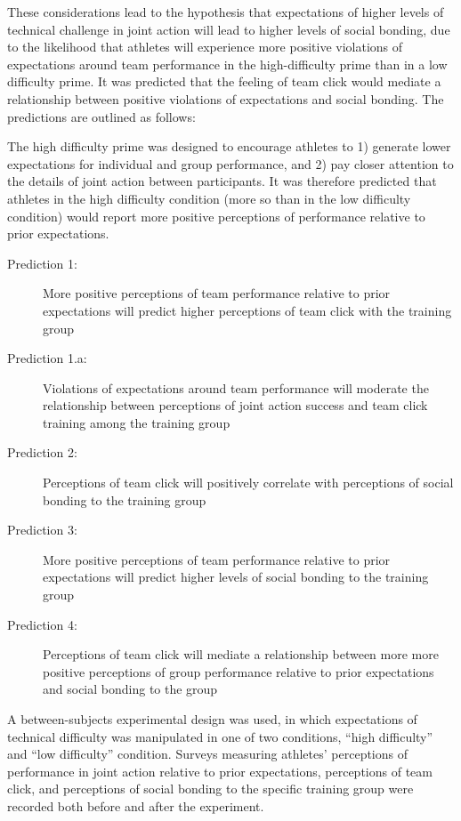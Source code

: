 These considerations lead to the hypothesis that expectations of higher levels of technical challenge in joint action will lead to higher levels of social bonding, due to the likelihood that athletes will experience more positive violations of expectations around team performance in the high-difficulty prime than in a low difficulty prime. It was predicted that the feeling of team click would mediate a relationship between positive violations of expectations and social bonding.  The predictions are outlined as follows:

The high difficulty prime was designed to encourage athletes to 1) generate lower expectations for individual and group performance, and 2) pay closer attention to the details of joint action between participants. It was therefore predicted that athletes in the high difficulty condition (more so than in the low difficulty condition) would report more positive perceptions of performance relative to prior expectations.

\begin{description}
\item[Prediction 1:] More positive perceptions of team performance relative to prior expectations will predict higher perceptions of team click with the training group
\item[Prediction 1.a:] Violations of expectations around team performance will moderate the relationship between perceptions of joint action success and team click training among the training group
\item[Prediction 2:] Perceptions of team click will positively correlate with perceptions of social bonding to the training group
\item[Prediction 3:] More positive perceptions of team performance relative to prior expectations will predict higher levels of social bonding to the training group
\item[Prediction 4:] Perceptions of team click will mediate a relationship between more more positive perceptions of group performance relative to prior expectations and social bonding to the group
\end{description}

A between-subjects experimental design was used, in which expectations of technical difficulty was manipulated in one of two conditions, ``high difficulty'' and ``low difficulty'' condition.  Surveys measuring athletes' perceptions of performance in joint action relative to prior expectations, perceptions of team click, and perceptions of social bonding to the specific training group were recorded both before and after the experiment.

